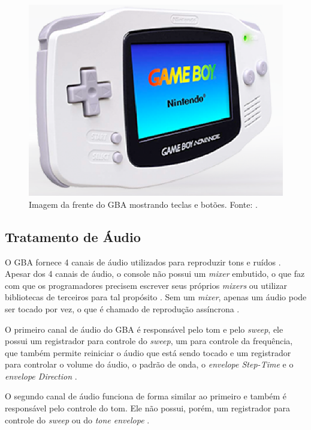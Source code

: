     \begin{figure}[H]
    \centering \includegraphics[keepaspectratio=true,scale=0.6]{figuras/gba-frente.eps}
      \caption[Imagem da frente do GBA mostrando teclas e botões]
        {Imagem da frente do GBA mostrando teclas e botões. Fonte: \cite{nintendo}.}
      \label{gba-frente}
    \end{figure}

  \subsection{Tratamento de Áudio}

    O GBA fornece 4 canais de áudio utilizados para reproduzir tons e ruídos \cite{gbatek}. Apesar dos 4 canais de áudio, o console não possui um \textit{mixer} embutido, o que faz com que os programadores precisem escrever seus próprios \textit{mixers} ou utilizar bibliotecas de terceiros para tal propósito \cite{harbour}. Sem um \textit{mixer}, apenas um áudio pode ser tocado por vez, o que é chamado de reprodução assíncrona \cite{harbour}.

    O primeiro canal de áudio do GBA é responsável pelo tom e pelo \textit{sweep}, ele possui um registrador para controle do \textit{sweep}, um para controle da frequência, que também permite reiniciar o áudio que está sendo tocado e um registrador para controlar o volume do áudio, o padrão de onda, o \textit{envelope Step-Time} e o \textit{envelope Direction} \cite{gbatek}.

    O segundo canal de áudio funciona de forma similar ao primeiro e também é responsável pelo controle do tom. Ele não possui, porém, um registrador para controle do \textit{sweep} ou do \textit{tone envelope} \cite{gbatek}.

